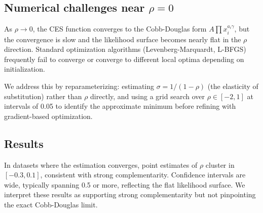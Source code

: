 \documentclass[12pt, a4paper]{article}
\theoremstyle{definition}
\theoremstyle{remark}
\begin{document}
\subsection{Numerical challenges near $\rho = 0$}

As $\rho \to 0$, the CES function converges to the Cobb-Douglas form $A \prod x_i^{a_i \gamma}$, but the convergence is slow and the likelihood surface becomes nearly flat in the $\rho$ direction. Standard optimization algorithms (Levenberg-Marquardt, L-BFGS) frequently fail to converge or converge to different local optima depending on initialization.

We address this by reparameterizing: estimating $\sigma = 1/(1-\rho)$ (the elasticity of substitution) rather than $\rho$ directly, and using a grid search over $\rho \in [-2, 1]$ at intervals of 0.05 to identify the approximate minimum before refining with gradient-based optimization.

\subsection{Results}

In datasets where the estimation converges, point estimates of $\rho$ cluster in $[-0.3, 0.1]$, consistent with strong complementarity. Confidence intervals are wide, typically spanning 0.5 or more, reflecting the flat likelihood surface. We interpret these results as supporting strong complementarity but not pinpointing the exact Cobb-Douglas limit.
\end{document}

